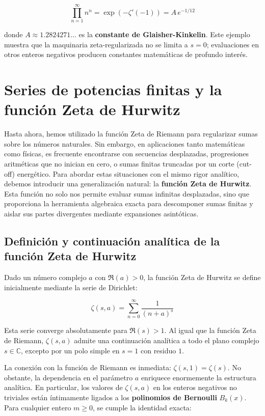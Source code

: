 $$ \prod_{n=1}^{\infty} n^n = \exp(-\zeta'(-1)) = A \, e^{-1/12} $$

donde $A \approx 1.2824271\dots$ es la \textbf{constante de Glaisher-Kinkelin}. Este ejemplo muestra que la maquinaria zeta-regularizada no se limita a $s=0$; evaluaciones en otros enteros negativos producen constantes matemáticas de profundo interés.

\section{Series de potencias finitas y la función Zeta de Hurwitz}

Hasta ahora, hemos utilizado la función Zeta de Riemann para regularizar sumas sobre los números naturales. Sin embargo, en aplicaciones tanto matemáticas como físicas, es frecuente encontrarse con secuencias desplazadas, progresiones aritméticas que no inician en cero, o sumas finitas truncadas por un corte (cut-off) energético. Para abordar estas situaciones con el mismo rigor analítico, debemos introducir una generalización natural: la \textbf{función Zeta de Hurwitz}. Esta función no solo nos permite evaluar sumas infinitas desplazadas, sino que proporciona la herramienta algebraica exacta para descomponer sumas finitas y aislar sus partes divergentes mediante expansiones asintóticas.

\subsection{Definición y continuación analítica de la función Zeta de Hurwitz}

Dado un número complejo $a$ con $\Re(a) > 0$, la función Zeta de Hurwitz se define inicialmente mediante la serie de Dirichlet:

$$ \zeta(s, a) = \sum_{n=0}^{\infty} \frac{1}{(n+a)^s} $$

Esta serie converge absolutamente para $\Re(s) > 1$. Al igual que la función Zeta de Riemann, $\zeta(s, a)$ admite una continuación analítica a todo el plano complejo $s \in \mathbb{C}$, excepto por un polo simple en $s=1$ con residuo $1$. 

La conexión con la función de Riemann es inmediata: $\zeta(s, 1) = \zeta(s)$. No obstante, la dependencia en el parámetro $a$ enriquece enormemente la estructura analítica. En particular, los valores de $\zeta(s, a)$ en los enteros negativos no triviales están íntimamente ligados a los \textbf{polinomios de Bernoulli} $B_k(x)$. Para cualquier entero $m \ge 0$, se cumple la identidad exacta:

